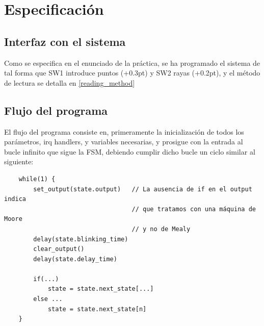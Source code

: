 \documentclass[a4paper,openright,12pt]{article}
\newcommand{\punto}{\kern+0.3pt\raisebox{0.35ex}{\huge\textbf.}}
\newcommand{\raya}{\kern+0.2pt\raisebox{-0.35ex}{\huge\textbf-}}
\begin{document}
\clearpage
\section{Especificación}
\subsection{Interfaz con el sistema}\label{design_button_translation}
Como se especifica en el enunciado de la práctica, se ha programado el sistema de tal forma que SW1 introduce puntos (\punto) y SW2 rayas (\raya), y el método de lectura se detalla en \ref{reading_method}

\subsection{Flujo del programa}
El flujo del programa consiste en, primeramente la inicialización de todos los parámetros, irq handlers, y variables necesarias, y prosigue con la entrada al bucle infinito que sigue la FSM,
debiendo cumplir dicho bucle un ciclo similar al siguiente:
\begin{samepage}    
\begin{verbatim}
    while(1) {
        set_output(state.output)   // La ausencia de if en el output indica
                                   // que tratamos con una máquina de Moore
                                   // y no de Mealy
        delay(state.blinking_time)
        clear_output()
        delay(state.delay_time)
        
        if(...)
            state = state.next_state[...]
        else ...
            state = state.next_state[n]
    }
\end{verbatim}
\end{samepage}


\clearpage
\end{document}
